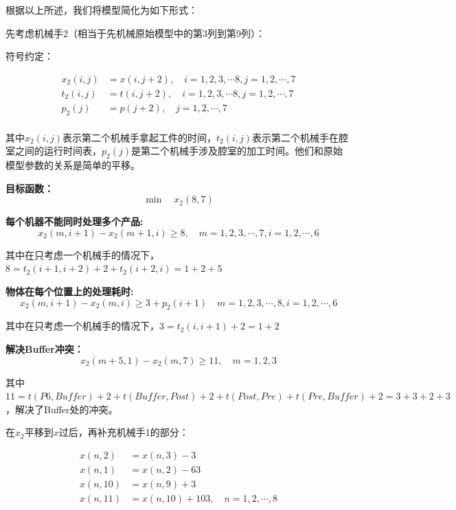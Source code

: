 \documentclass{ctexart}
\begin{document}
{{	
	根据以上所述，我们将模型简化为如下形式：
	
	先考虑机械手2（相当于先机械原始模型中的第3列到第9列）：
	
	符号约定：
	
	$$
	\begin{aligned}
	x_2(i,j)&=x(i,j+2), \quad i=1,2,3,\cdots 8, j=1,2,\cdots, 7 \\
	t_2(i,j)&=t(i,j+2), \quad i=1,2,3,\cdots 8, j=1,2,\cdots, 7 \\
	p_2(j)&=p(j+2), \quad j=1,2,\cdots, 7 \\
	\end{aligned}
	$$
	
	其中$x_2(i,j)$表示第二个机械手拿起工件的时间，$t_2(i,j)$表示第二个机械手在腔室之间的运行时间表，$p_2(j)$是第二个机械手涉及腔室的加工时间。他们和原始模型参数的关系是简单的平移。
	
	\vspace{10pt}
	
	\textbf{目标函数：}
	$$
	\min \quad x_2(8,7)
	$$
	
	\vspace{10pt}
	
	\textbf{每个机器不能同时处理多个产品:}
	$$
	x_2(m,i+1)-x_2(m+1,i) \ge 8,\quad m=1,2,3,\cdots,7, i=1,2,\cdots,6
	$$
	
	其中在只考虑一个机械手的情况下，$8=t_2(i+1,i+2)+2+t_2(i+2,i)=1+2+5$
	
	\vspace{10pt}
	
	\textbf{物体在每个位置上的处理耗时:}
	$$
	x_2(m,i+1) - x_2(m,i) \ge 3+ p_2(i+1) \quad m=1,2,3,\cdots,8, i=1,2,\cdots,6
	$$
	
	其中在只考虑一个机械手的情况下，$3=t_2(i,i+1)+2=1+2$
	
	\vspace{10pt}
	
	\textbf{解决Buffer冲突：}
	$$
	x_2(m+5,1) - x_2(m,7) \ge 11, \quad m=1,2,3
	$$
	
	其中$11=t(P6,Buffer)+2+t(Buffer,Post)+2+t(Post,Pre)+t(Pre,Buffer)+2=3+3+2+3$，解决了Buffer处的冲突。
	
	\vspace{10pt}
	
	在$x_2$平移到$x$过后，再补充机械手1的部分：
	
	$$
	\begin{aligned}
	x(n,2)&=x(n,3)-3 \\
	x(n,1)&=x(n,2)-63 \\
	x(n,10)&=x(n,9)+3 \\
	x(n,11)&=x(n,10)+103,\quad n=1,2,\cdots,8 \\
	\end{aligned}
	$$
	
}}
\end{document}
